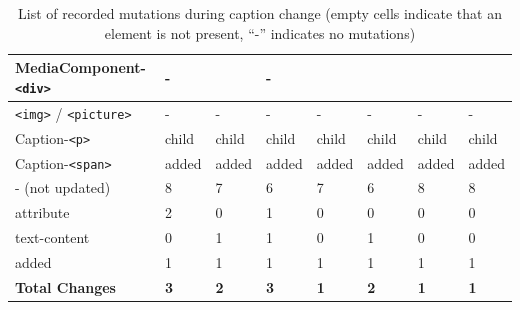 \documentclass[a4paper, 12pt]{article}
\begin{document}
\begin{table}[!ht]
\begin{adjustbox}{angle=90}
\begin{tabular}{|l|l|l|l|l|l|l|l|}
      MediaComponent-\verb|<div>|     & -                 & ~               & -                 & ~             & ~               & ~               & ~               \\ \hline
      \verb|<img>| / \verb|<picture>| & -                 & -               & -                 & -             & -               & -               & -               \\ \hline
      Caption-\verb|<p>|              & child             & child           & child             & child         & child           & child           & child           \\ \hline
      Caption-\verb|<span>|           & added             & added           & added             & added         & added           & added           & added           \\ \hline
      \hline
      - (not updated)                 & 8                 & 7               & 6                 & 7             & 6               & 8               & 8               \\ \hline
      \hline
      attribute                       & 2                 & 0               & 1                 & 0             & 0               & 0               & 0               \\ \hline
      text-content                    & 0                 & 1               & 1                 & 0             & 1               & 0               & 0               \\ \hline
      added                           & 1                 & 1               & 1                 & 1             & 1               & 1               & 1               \\ \hline
      \hline
      \textbf{Total Changes}          & \textbf{3}        & \textbf{2}      & \textbf{3}        & \textbf{1}    & \textbf{2}      & \textbf{1}      & \textbf{1}      \\ \hline
    \end{tabular}
  \end{adjustbox}
  \caption{List of recorded mutations during caption change (empty cells indicate that an element is not present, \enquote{-} indicates no mutations)}
  \label{tab:mutations:captionChange}
\end{table}
\end{document}
